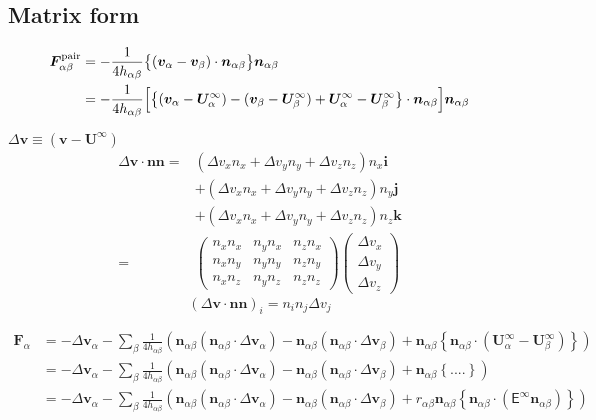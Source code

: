 \documentclass[12pt]{article}
\newcommand{\tens}[1]{\bm{\mathsf{#1}}}
\begin{document}
\subsection*{Matrix form}
\begin{align*}
 \bm{F}_{\alpha\beta}^{\mathrm{pair}}
&= 
- \frac{1}{4 h_{\alpha\beta}}
\bigl\{
(\bm{v}_\alpha-
\bm{v}_\beta)\cdot
\bm{n}_{\alpha\beta}
\bigr\}\bm{n}_{\alpha\beta} \\
&=
- \frac{1}{4 h_{\alpha\beta}}
\Bigl[
\bigl\{
(\bm{v}_\alpha- \bm{U}^{\infty}_\alpha)-
(\bm{v}_\beta- \bm{U}^{\infty}_\beta)
+ \bm{U}^{\infty}_\alpha
- \bm{U}^{\infty}_\beta
\bigr\}\cdot
\bm{n}_{\alpha\beta}
\Bigr]
\bm{n}_{\alpha\beta}
\end{align*}


$\Delta \bm{v} \equiv (\bm{v}- \bm{U}^{\infty})$
\begin{align*}
\Delta \bm{v} \cdot
\bm{n} \bm{n}
= &
(\Delta v_x n_x 
+\Delta v_y n_y
+\Delta v_z n_z) n_x \bm{i}\\
& 
+ (\Delta v_x n_x 
+\Delta v_y n_y
+\Delta v_z n_z) n_y \bm{j}\\
&
+ (\Delta v_x n_x 
+\Delta v_y n_y
+\Delta v_z n_z) n_z \bm{k} \\
=&
\begin{pmatrix}
 n_x n_x &   n_y n_x &   n_z n_x \\
 n_x n_y &   n_y n_y &   n_z n_y \\
 n_x n_z &   n_y n_z &   n_z n_z 
\end{pmatrix}
\begin{pmatrix}
 \Delta v_x \\
 \Delta v_y \\
 \Delta v_z 
\end{pmatrix} 
\end{align*}
\begin{equation*}
(\Delta \bm{v} \cdot
\bm{n} \bm{n})_i
= n_i n_j \Delta v_j
\end{equation*}


\begin{align*}
  \bm{F}_\alpha  &= 
  -  \Delta \bm{v}_\alpha
  - \sum_{\beta}
  \frac{1}{4h_{\alpha\beta}}
  \left(
    \bm{n}_{\alpha\beta} (\bm{n}_{\alpha\beta}\cdot \Delta \bm{v}_{\alpha})
    - 
    \bm{n}_{\alpha\beta} (\bm{n}_{\alpha\beta}\cdot \Delta \bm{v}_\beta )
    +
    \bm{n}_{\alpha\beta}
    \left\{
      \bm{n}_{\alpha\beta}  \cdot
      (\bm{U}_{\alpha}^{\infty}-\bm{U}_{\beta}^{\infty})
    \right\}
  \right)  \\
&=  -  \Delta \bm{v}_\alpha 
 - \sum_{\beta}
  \frac{1}{4h_{\alpha\beta}}
  \left(
    \bm{n}_{\alpha\beta} (\bm{n}_{\alpha\beta}\cdot \Delta \bm{v}_{\alpha})
    - 
    \bm{n}_{\alpha\beta} (\bm{n}_{\alpha\beta}\cdot \Delta \bm{v}_\beta )
    +
    \bm{n}_{\alpha\beta}
    \left\{
  ....
    \right\}
  \right) \\
&=  -  \Delta \bm{v}_\alpha 
 - \sum_{\beta}
  \frac{1}{4h_{\alpha\beta}}
  \left(
    \bm{n}_{\alpha\beta} (\bm{n}_{\alpha\beta}\cdot \Delta \bm{v}_{\alpha})
    - 
    \bm{n}_{\alpha\beta} (\bm{n}_{\alpha\beta}\cdot \Delta \bm{v}_\beta )
    +
r_{\alpha\beta}
  \bm{n}_{\alpha\beta}
  \left\{
\bm{n}_{\alpha\beta} \cdot
(\tens{E}^{\infty} \bm{n}_{\alpha\beta})
    \right\} 
  \right) 
\end{align*}
\end{document}
